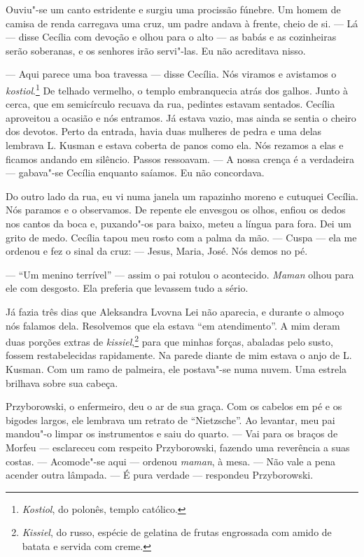 Ouviu"-se um canto estridente e surgiu uma procissão fúnebre. Um homem de
camisa de renda carregava uma cruz, um padre andava à frente, cheio de
si. --- Lá --- disse Cecília com devoção e olhou para o alto --- as
babás e as cozinheiras serão soberanas, e os senhores irão servi"-las. Eu
não acreditava nisso.

--- Aqui parece uma boa travessa --- disse Cecília. Nós viramos e
avistamos o \emph{kostiol}.\footnote{\emph{Kostiol}, do polonês, templo
  católico.} De telhado vermelho, o templo embranquecia atrás dos
galhos. Junto à cerca, que em semicírculo recuava da rua, pedintes
estavam sentados. Cecília aproveitou a ocasião e nós entramos. Já estava
vazio, mas ainda se sentia o cheiro dos devotos. Perto da entrada, havia
duas mulheres de pedra e uma delas lembrava L. Kusman e estava coberta
de panos como ela. Nós rezamos a elas e ficamos andando em silêncio.
Passos ressoavam. --- A nossa crença é a verdadeira --- gabava"-se
Cecília enquanto saíamos. Eu não concordava.

Do outro lado da rua, eu vi numa janela um rapazinho moreno e cutuquei
Cecília. Nós paramos e o observamos. De repente ele envesgou os olhos,
enfiou os dedos nos cantos da boca e, puxando"-os para baixo, meteu a
língua para fora. Dei um grito de medo. Cecília tapou meu rosto com a
palma da mão. --- Cuspa --- ela me ordenou e fez o sinal da cruz: ---
Jesus, Maria, José. Nós demos no pé.

--- ``Um menino terrível'' --- assim o pai rotulou o acontecido.
\emph{Maman} olhou para ele com desgosto. Ela preferia que levassem tudo
a sério.

Já fazia três dias que Aleksandra Lvovna Lei não aparecia, e durante o
almoço nós falamos dela. Resolvemos que ela estava ``em atendimento''. A
mim deram duas porções extras de \emph{kissiel},\footnote{\emph{Kissiel},
  do russo, espécie de gelatina de frutas engrossada com amido de batata
  e servida com creme.} para que minhas forças, abaladas pelo susto,
fossem restabelecidas rapidamente. Na parede diante de mim estava o anjo
de L. Kusman. Com um ramo de palmeira, ele postava"-se numa nuvem. Uma
estrela brilhava sobre sua cabeça.

Przyborowski, o enfermeiro, deu o ar de sua graça. Com os cabelos em pé
e os bigodes largos, ele lembrava um retrato de ``Nietzsche''. Ao
levantar, meu pai mandou"-o limpar os instrumentos e saiu do quarto. ---
Vai para os braços de Morfeu --- esclareceu com respeito Przyborowski,
fazendo uma reverência a suas costas. --- Acomode"-se aqui --- ordenou
\emph{maman}, à mesa. --- Não vale a pena acender outra lâmpada. --- É
pura verdade --- respondeu Przyborowski.

